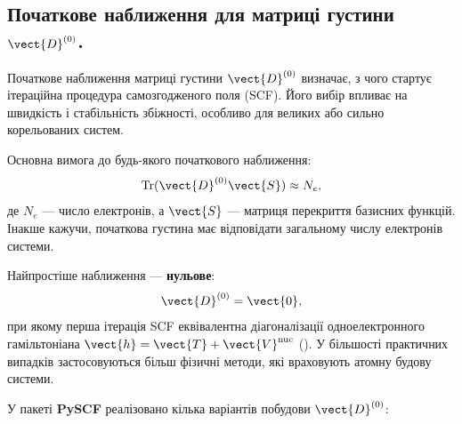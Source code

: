 \subsection{Початкове наближення для матриці густини $\vect{D}^{(0)}$.}

Початкове наближення матриці густини $\vect{D}^{(0)}$ визначає, з чого стартує ітераційна процедура самозгодженого поля (SCF).
Його вибір впливає на швидкість і стабільність збіжності, особливо для великих або сильно корельованих систем.

Основна вимога до будь-якого початкового наближення:
\[
	\text{Tr}(\vect{D}^{(0)} \vect{S}) \approx N_e,
\]
де $N_e$ — число електронів, а $\vect{S}$ --- матриця перекриття базисних функцій.
Інакше кажучи, початкова густина має відповідати загальному числу електронів системи.

Найпростіше наближення --- \textbf{нульове}:
\[
	\vect{D}^{(0)} = \vect{0},
\]
при якому перша ітерація SCF еквівалентна діагоналізації одноелектронного гамільтоніана
$\vect{h} = \vect{T} + \vect{V}^{\text{nuc}}$ ().
У більшості практичних випадків застосовуються більш фізичні методи, які враховують атомну будову системи.

У пакеті \textbf{PySCF} реалізовано кілька варіантів побудови $\vect{D}^{(0)}$:

